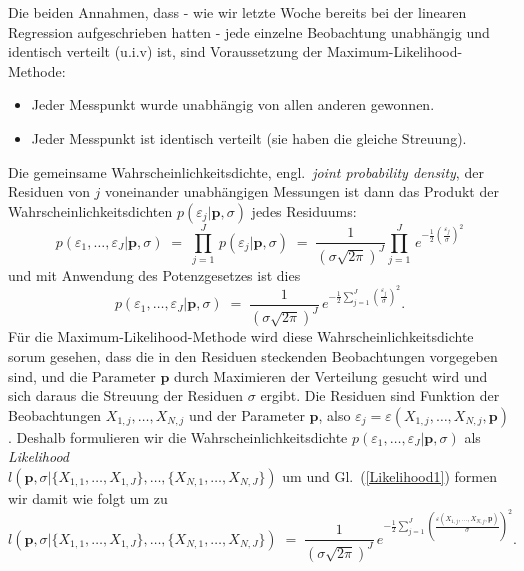 Die beiden Annahmen, dass - wie wir letzte Woche bereits bei der linearen Regression
aufgeschrieben hatten - jede einzelne Beobachtung unabhängig und identisch verteilt 
(u.i.v) ist, sind Voraussetzung der Maximum-Likelihood-Methode:
\begin{itemize}
\item Jeder Messpunkt wurde unabhängig von allen anderen gewonnen.
\item Jeder Messpunkt ist identisch verteilt (sie haben die gleiche Streuung).
\end{itemize}
Die gemeinsame Wahrscheinlichkeitsdichte, engl.\ \textsl{joint probability density}, der
Residuen von $j$ voneinander unabhängigen Messungen ist dann das Produkt der
Wahrscheinlichkeitsdichten $p(\varepsilon_j | \mathbf{p}, \sigma)$
jedes Residuums:
\begin{equation}
p(\varepsilon_1,\dots,\varepsilon_J | \mathbf{p}, \sigma) \; = \; 
\prod\limits_{j = 1}^J \, p(\varepsilon_j | \mathbf{p}, \sigma) \; = \; 
 \frac{1}{(\sigma \sqrt{2 \pi})^J} \prod\limits_{j = 1}^J \, 
e^{-\frac{1}{2} \left(\frac{\varepsilon_j}{\sigma}\right)^2}
\end{equation}
und mit Anwendung des Potenzgesetzes ist dies
\begin{equation}
p(\varepsilon_1,\dots,\varepsilon_J | \mathbf{p}, \sigma) \; = \; 
 \frac{1}{(\sigma \sqrt{2 \pi})^J}  \, 
e^{-\frac{1}{2} \sum\limits_{j = 1}^J \left(\frac{\varepsilon_j}{\sigma}\right)^2} .
\label{Likelihood1}
\end{equation}
Für die Maximum-Likelihood-Methode wird diese Wahrscheinlichkeitsdichte sorum gesehen,
dass die in den Residuen steckenden Beobachtungen vorgegeben sind, und die 
Parameter $\mathbf{p}$ durch Maximieren der Verteilung gesucht wird und sich daraus
die Streuung der Residuen $\sigma$ ergibt. Die Residuen sind Funktion der
Beobachtungen $X_{1,j},\dots,X_{N,j}$ und der Parameter $\mathbf{p}$, also
$\varepsilon_j = \varepsilon(X_{1,j},\dots,X_{N,j}, \mathbf{p})$. 
Deshalb formulieren wir die Wahrscheinlichkeitsdichte
$p(\varepsilon_1,\dots,\varepsilon_J | \mathbf{p}, \sigma)$ 
als \textsl{Likelihood} \\
$l(\mathbf{p}, \sigma | \{X_{1,1}, \dots, X_{1,J}\}, \dots, \{X_{N,1}, \dots, X_{N,J}\})$
um und Gl.~(\ref{Likelihood1}) formen wir damit wie folgt um zu
\begin{equation}
l(\mathbf{p}, \sigma | \{X_{1,1}, \dots, X_{1,J}\}, \dots, \{X_{N,1}, \dots, X_{N,J}\}) \; = \; 
 \frac{1}{(\sigma \sqrt{2 \pi})^J}  \, 
e^{-\frac{1}{2} \sum\limits_{j = 1}^J \left(\frac{\varepsilon(X_{1,j},\dots,X_{N,j}, \mathbf{p})}{\sigma}\right)^2} .
\label{Likelihood2}
\end{equation}

